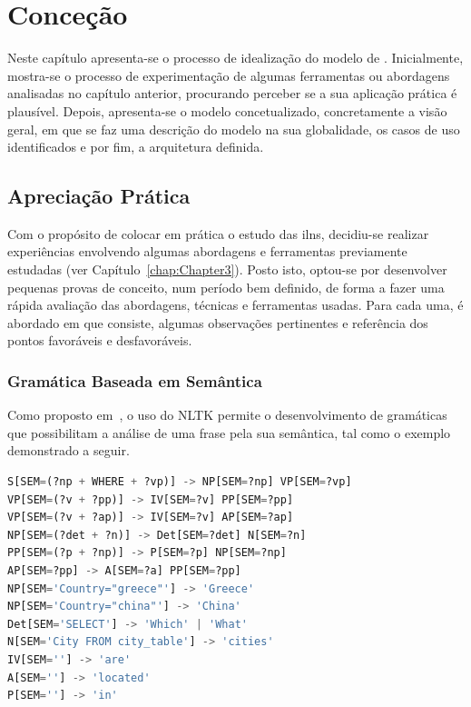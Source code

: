 \chapter{Conceção}
\label{chap:Chapter4}
Neste capítulo apresenta-se o processo de idealização do modelo de . Inicialmente, mostra-se o processo de experimentação de algumas ferramentas ou abordagens analisadas no capítulo anterior, procurando perceber se a sua aplicação prática é plausível. Depois, apresenta-se o modelo concetualizado, concretamente a visão geral, em que se faz uma descrição do modelo na sua globalidade, os casos de uso identificados e por fim, a arquitetura definida.

\section{Apreciação Prática}
\label{sec:chap04_approaches}
Com o propósito de colocar em prática o estudo das \glspl{iln}, decidiu-se realizar experiências envolvendo algumas abordagens e ferramentas previamente estudadas (ver Capítulo~\ref{chap:Chapter3}). Posto isto, optou-se por desenvolver pequenas provas de conceito, num período bem definido, de forma a fazer uma rápida avaliação das abordagens, técnicas e ferramentas usadas. Para cada uma, é abordado em que consiste, algumas observações pertinentes e referência dos pontos favoráveis e desfavoráveis.

\subsection{Gramática Baseada em Semântica}
Como proposto em~\textcite[p.~361-403]{natural_language_processing_with_python}, o uso do NLTK permite o desenvolvimento de gramáticas que possibilitam a análise de uma frase pela sua semântica, tal como o exemplo demonstrado a seguir.

\begin{lstlisting}[language=Python,caption={Excerto de uma gramática extraída de~\textcite{natural_language_processing_with_python}},numbers=none,label=lst:grammarexample,basicstyle=\scriptsize]
S[SEM=(?np + WHERE + ?vp)] -> NP[SEM=?np] VP[SEM=?vp]
VP[SEM=(?v + ?pp)] -> IV[SEM=?v] PP[SEM=?pp]
VP[SEM=(?v + ?ap)] -> IV[SEM=?v] AP[SEM=?ap]
NP[SEM=(?det + ?n)] -> Det[SEM=?det] N[SEM=?n]
PP[SEM=(?p + ?np)] -> P[SEM=?p] NP[SEM=?np]
AP[SEM=?pp] -> A[SEM=?a] PP[SEM=?pp]
NP[SEM='Country="greece"'] -> 'Greece'
NP[SEM='Country="china"'] -> 'China'
Det[SEM='SELECT'] -> 'Which' | 'What'
N[SEM='City FROM city_table'] -> 'cities'
IV[SEM=''] -> 'are'
A[SEM=''] -> 'located'
P[SEM=''] -> 'in'
\end{lstlisting}

